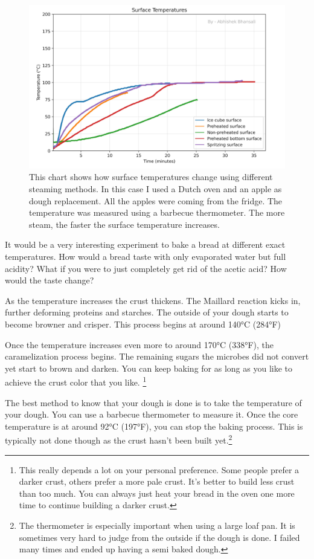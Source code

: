 \begin{figure}[!htb]
  \includegraphics[width=\textwidth]{baking-experiment-temperatures.png}
  \caption{This chart shows how surface temperatures change using
  different steaming methods. In this case I used a Dutch oven and an apple as
  dough replacement. All the apples were coming from the fridge. The temperature
  was measured using a barbecue thermometer.
  The more steam, the faster the surface temperature increases.}
\end{figure}

It would be a very interesting experiment to bake a bread at different exact
temperatures. How would a bread taste with only evaporated water but
full acidity? What if you were to just completely get rid of the acetic
acid? How would the taste change?

As the temperature increases
the crust thickens. The Maillard reaction kicks in, further deforming
proteins and starches. The outside of your dough starts to become
browner and crisper. This process begins at around 140°C (284°F)

Once the temperature increases even more to around 170°C (338°F),
the caramelization process begins. The remaining sugars the microbes
did not convert yet start to brown and darken. You can keep baking
for as long as you like to achieve the crust color that you like.
\footnote{This really depends a lot on your personal preference.
Some people prefer a darker crust, others prefer a more pale crust.
It's better to build less crust than too much. You can always just
heat your bread in the oven one more time to continue building a
darker crust.}

The best method to know that your dough is done is to take
the temperature of your dough. You can use a barbecue thermometer
to measure it. Once the core temperature is at around 92°C (197°F),
you can stop the baking process. This is typically not done though
as the crust hasn't been built yet.\footnote{The thermometer is
especially important when using a large loaf pan. It is sometimes
very hard to judge from the outside if the dough is done. I failed
many times and ended up having a semi baked dough.}


